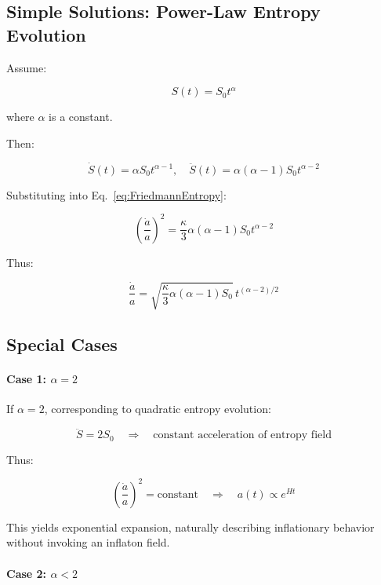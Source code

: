 \documentclass{article}
\begin{document}
\subsection{Simple Solutions: Power-Law Entropy Evolution}

Assume:

\begin{equation}
S(t) = S_0 t^\alpha
\end{equation}

where $\alpha$ is a constant.

Then:

\[
\dot{S}(t) = \alpha S_0 t^{\alpha-1}, \quad \ddot{S}(t) = \alpha(\alpha-1) S_0 t^{\alpha-2}
\]

Substituting into Eq.~\eqref{eq:FriedmannEntropy}:

\begin{equation}
\left( \frac{\dot{a}}{a} \right)^2 = \frac{\kappa}{3} \alpha(\alpha-1) S_0 t^{\alpha-2}
\end{equation}

Thus:

\begin{equation}
\frac{\dot{a}}{a} = \sqrt{ \frac{\kappa}{3} \alpha(\alpha-1) S_0 } \, t^{(\alpha-2)/2}
\end{equation}

\subsection{Special Cases}

\paragraph{Case 1: $\alpha = 2$}

If $\alpha = 2$, corresponding to quadratic entropy evolution:

\[
\ddot{S} = 2S_0
\quad \Rightarrow \quad \text{constant acceleration of entropy field}
\]

Thus:

\[
\left( \frac{\dot{a}}{a} \right)^2 = \text{constant}
\quad \Rightarrow \quad a(t) \propto e^{Ht}
\]

This yields exponential expansion, naturally describing inflationary behavior without invoking an inflaton field.

\paragraph{Case 2: $\alpha < 2$}
\end{document}

